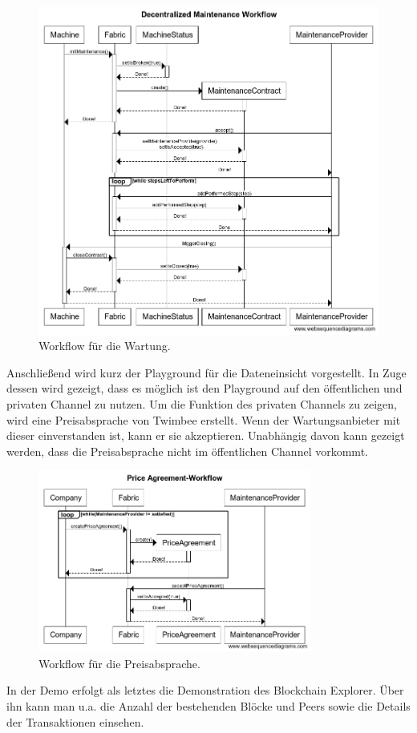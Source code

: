 \begin{figure}[!htbp]
    \centering
      \includegraphics[width=1.0\textwidth,angle=0]{images/maintenance-workflow}
       \caption{Workflow für die Wartung.}
      \label{fig:maintenance-workflow}
\end{figure}

Anschließend wird kurz der Playground für die Dateneinsicht vorgestellt. In Zuge dessen wird gezeigt, dass es möglich ist den Playground auf den öffentlichen und privaten Channel zu nutzen. Um die Funktion des privaten Channels zu zeigen, wird eine Preisabsprache von Twimbee erstellt. Wenn der Wartungsanbieter mit dieser einverstanden ist, kann er sie akzeptieren. Unabhängig davon kann gezeigt werden, dass die Preisabsprache nicht im öffentlichen Channel vorkommt.

\begin{figure}[!htbp]
    \centering
      \includegraphics[width=0.8\textwidth,angle=0]{images/priceagreement-workflow}
       \caption{Workflow für die Preisabsprache.}
      \label{fig:priceagreement-workflow}
\end{figure}

In der Demo erfolgt als letztes die Demonstration des Blockchain Explorer. Über ihn kann man u.a. die Anzahl der bestehenden Blöcke und Peers sowie die Details der Transaktionen einsehen.









